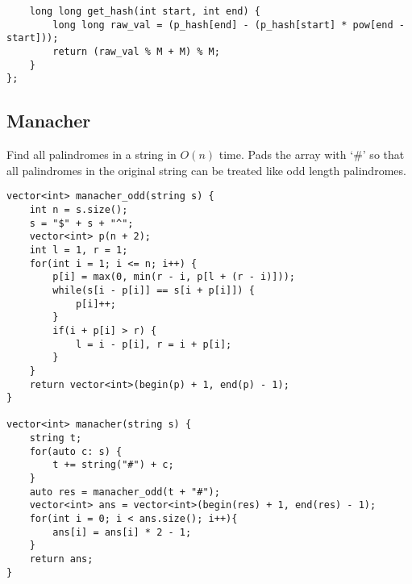 \documentclass[8pt, headheight=10pt, a4paper]{article}
\begin{document}
\begin{multicols*}{3}
\begin{lstlisting}
	long long get_hash(int start, int end) {
		long long raw_val = (p_hash[end] - (p_hash[start] * pow[end - start]));
		return (raw_val % M + M) % M;
	}
};
\end{lstlisting}

\subsection{Manacher}
Find all palindromes in a string in $O(n)$ time. Pads the array with `\#' so that all palindromes in the original string can be treated like odd length palindromes.
\begin{lstlisting}
vector<int> manacher_odd(string s) {
    int n = s.size();
    s = "$" + s + "^";
    vector<int> p(n + 2);
    int l = 1, r = 1;
    for(int i = 1; i <= n; i++) {
        p[i] = max(0, min(r - i, p[l + (r - i)]));
        while(s[i - p[i]] == s[i + p[i]]) {
            p[i]++;
        }
        if(i + p[i] > r) {
            l = i - p[i], r = i + p[i];
        }
    }
    return vector<int>(begin(p) + 1, end(p) - 1);
}

vector<int> manacher(string s) {
    string t;
    for(auto c: s) {
        t += string("#") + c;
    }
    auto res = manacher_odd(t + "#");
    vector<int> ans = vector<int>(begin(res) + 1, end(res) - 1);
    for(int i = 0; i < ans.size(); i++){
        ans[i] = ans[i] * 2 - 1;
    }
    return ans;
}
\end{lstlisting}


\end{multicols*}
\end{document}
